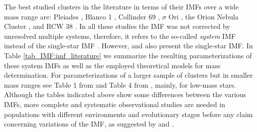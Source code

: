 \documentclass[12pt]{article}
\begin{document}
The best studied clusters in the literature in terms of their IMFs over a wide mass range are: Pleiades \citep[0.03~-~10 $M_\odot$;][]{Moraux2003}, Blanco 1 \citep[0.03~-~3 $M_\odot$;][]{Moraux2007a}, Collinder 69 \citep[0.016~-~20 $M_\odot$;][]{Bayo2011}, $\sigma$ Ori \citep[0.006~-~19 $M_\odot$;][]{PenaRamirez2012}, the Orion Nebula Cluster \citep[ONC; 0.025~-~3 $M_\odot$, $\approx$0.005~-~1 $M_\odot$;][respectively]{DaRio2012,Drass2016}, and RCW 38 \citep[0.02~-~20 $M_\odot$;][]{Muzic2017}. In all these studies the IMF was not corrected by unresolved multiple systems, therefore, it refers to the so-called {\it system} IMF instead of the single-star IMF \citep{Chabrier2003a}. However, \citet{Moraux2003} and \citet{Muzic2017} also present the single-star IMF. In Table \ref{tab_IMF:imf_literature} we summarize the resulting parameterizations of these system IMFs as well as the employed theoretical models for mass determination. For parameterizations of a larger sample of clusters but in smaller mass ranges see Table 1 from \citet{DeMarchi2010} and Table 4 from \citet{Muzic2017}, mainly, for low-mass stars. Although the tables indicated above show some differences between the various IMFs, more complete and systematic observational studies are needed in populations with different environments and evolutionary stages before any claim concerning variations of the IMF, as suggested by \citet{Bastian2010} and \citet{Offner2014}.
\end{document}
